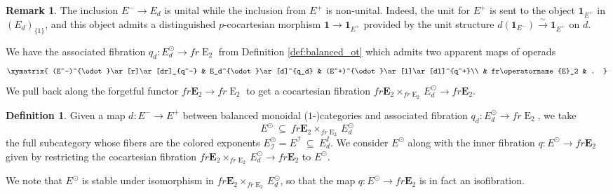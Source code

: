 \documentclass[reqno]{amsart}
\theoremstyle{definition}
\newtheorem{definition}[lemma]{Definition}
\newtheorem{remark}[lemma]{Remark}
\newcommand{\mcl}[1]{\mathcal{#1}}
\newcommand{\opn}[1]{\operatorname{#1}}
\newcommand{\E}{\mathbf{E}}
\renewcommand{\1}{\mathbf{1}}
\begin{document}
\begin{remark}
The inclusion $E^-\to E_d$ is unital while the inclusion from $E^+$ is non-unital. Indeed, the unit for $E^+$ is sent to the object $\1_{E^+}$ in $(E_d)_{\{1\}}$, and this object admits a distinguished $p$-cocartesian morphism $\1\to \1_{E^+}$ provided by the unit structure $d(\1_{E^-})\overset{\sim}\to \1_{E^+}$ on $d$.
\end{remark}

We have the associated fibration $q_d:E_d^{\odot}\to fr\opn{E}_2$ from Definition \ref{def:balanced_ot} which admits two apparent maps of operads
\[
\xymatrix{
(E^-)^{\odot}\ar[r]\ar[dr]_{q^-} & E_d^{\odot}\ar[d]^{q_d} & (E^+)^{\odot}\ar[l]\ar[dl]^{q^+}\\
	& fr\opn{E}_2 & .
}
\]
We pull back along the forgetful functor $fr\E_2\to fr\opn{E}_2$ to get a cocartesian fibration $fr\E_2\times_{fr\opn{E}_2}E_d^{\odot}\to fr\E_2$.

\begin{definition}
Given a map $d:E^-\to E^+$ between balanced monoidal ($1$-)categories and associated fibration $q_d:E_d^{\odot}\to fr\opn{E}_2$, we take
\[
E^{\odot}\ \subseteq\ fr\E_2\times_{fr\opn{E}_2}E_d^{\odot}
\]
the full subcategory whose fibers are the colored exponents $E^{\odot}_{\mcl{I}}=E^{\mcl{I}}\ \subseteq\ E_d^I$. We consider $E^{\odot}$ along with the inner fibration $q:E^{\odot}\to fr\E_2$ given by restricting the cocartesian fibration $fr\E_2\times_{fr\opn{E}_2}E_d^{\odot}\to fr\E_2$ to $E^{\odot}$.
\end{definition}

We note that $E^{\odot}$ is stable under isomorphism in $fr\E_2\times_{fr\opn{E}_2}E_d^{\odot}$, so that the map $q:E^{\odot}\to fr\E_2$ is in fact an isofibration.  
\par
\end{document}
